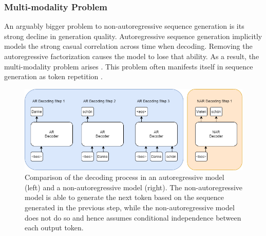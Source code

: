 \subsubsection{Multi-modality Problem} \label{subsubsec:nat_prob_multimodal}
An arguably bigger problem to non-autoregressive sequence generation is its strong decline in generation quality. Autoregressive sequence generation implicitly models the strong casual correlation across time \cite{gu_non-autoregressive_2018} when decoding. Removing the autoregressive factorization causes the model to lose that ability. As a result, the multi-modality problem arises \cite{gu_non-autoregressive_2018, zhou_understanding_2020}. This problem often manifests itself in sequence generation as token repetition \cite{ran_learning_to_recover_2020}.

\begin{figure}[hpbt!]

    \centering
    \includegraphics[width=\textwidth]{images/chap02_images/AT_vs_NAT.png}
    \caption{Comparison of the decoding process in an autoregressive model (left) and a non-autoregressive model (right). The non-autoregressive model is able to generate the next token based on the sequence generated in the previous step, while the non-autoregressive model does not do so and hence assumes conditional independence between each output token.}
    \label{fig:AT_vs_NAT}
\end{figure}

